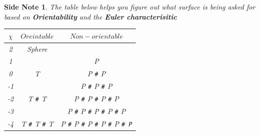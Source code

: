\documentclass[executivepaper]{article}
\newtheorem{sidenote}{Side Note}
\begin{document}
\begin{tcolorbox}

\begin{sidenote}

\textit{The table below helps you figure out what surface is being asked for based on \textbf{Orientability} and the \textbf{Euler characterisitic}}

\vspace{2mm}

\begin{tabular}{||c c c||}

\hline

\textit{$\chi$} & \textit{$Oreintable$} & \textit{$Non-orientable$} \\ [0.5ex]

\hline\hline

2 & Sphere & \\ 

\hline

1 & & P \\

\hline

0 & T & P \texttt{\#} P \\

\hline

-1 &  & P \texttt{\#} P \texttt{\#} P \\

\hline

-2 & T \texttt{\#} T & P \texttt{\#} P \texttt{\#} P \texttt{\#} P  \\

\hline

-3 & & P \texttt{\#} P \texttt{\#} P \texttt{\#} P \texttt{\#} P  \\

\hline

-4 & T \texttt{\#} T \texttt{\#} T & P \texttt{\#} P \texttt{\#} P \texttt{\#} P \texttt{\#} P \texttt{\# P}  \\ [1ex]

\hline

\end{tabular}

\end{sidenote}

\end{tcolorbox}
\end{document}
